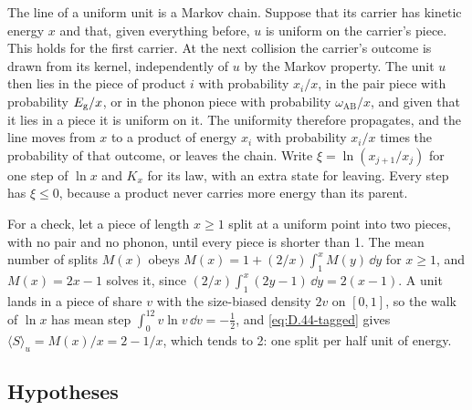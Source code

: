 The line of a uniform unit is a Markov chain. Suppose that its carrier has kinetic energy $x$ and that, given everything before, $u$ is uniform on the carrier's piece. This holds for the first carrier. At the next collision the carrier's outcome is drawn from its kernel, independently of $u$ by the Markov property. The unit $u$ then lies in the piece of product $i$ with probability $x_i/x$, in the pair piece with probability $E_{\mathrm{g}}/x$, or in the phonon piece with probability $\omega_{\mathrm{AB}}/x$, and given that it lies in a piece it is uniform on it. The uniformity therefore propagates, and the line moves from $x$ to a product of energy $x_i$ with probability $x_i/x$ times the probability of that outcome, or leaves the chain. Write $\xi = \ln(x_{j+1}/x_j)$ for one step of $\ln x$ and $K_x$ for its law, with an extra state for leaving. Every step has $\xi \le 0$, because a product never carries more energy than its parent.

For a check, let a piece of length $x \ge 1$ split at a uniform point into two pieces, with no pair and no phonon, until every piece is shorter than 1. The mean number of splits $M(x)$ obeys $M(x) = 1 + (2/x)\int_1^xM(y)\,\dd y$ for $x \ge 1$, and $M(x) = 2x - 1$ solves it, since $(2/x)\int_1^x(2y - 1)\,\dd y = 2(x - 1)$. A unit lands in a piece of share $v$ with the size-biased density $2v$ on $[0, 1]$, so the walk of $\ln x$ has mean step $\int_0^12v\ln v\,\dd v = -\tfrac12$, and \cref{eq:D.44-tagged} gives $\langle S\rangle_u = M(x)/x = 2 - 1/x$, which tends to 2: one split per half unit of energy.

\subsection{Hypotheses}

